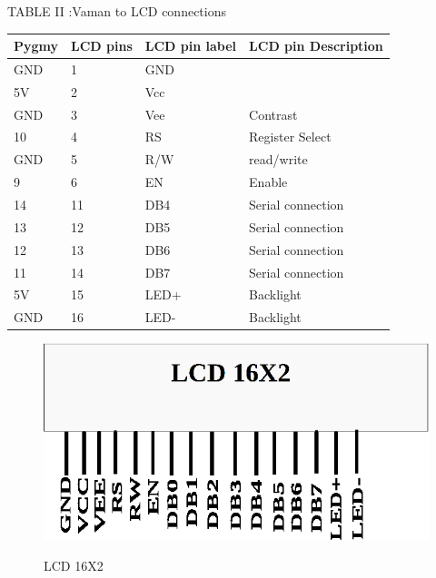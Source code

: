 \documentclass[twocolumn,13pt]{article}
\begin{document}
\begin{center}
    TABLE II :Vaman to LCD connections
\end{center}
 \begin{tabular}{ |p{1.5cm}|p{1.5cm}|p{1.5cm}|p{1.5cm}| }
 \hline
 \setlength{\tabcolsep}{3pt}
Pygmy & LCD pins & LCD pin label & LCD pin Description\\
\hline
 GND & 1& GND & \\
 \hline
 5V & 2 & Vcc &\\
 \hline
 GND & 3 & Vee & Contrast\\
 \hline
 10 & 4 & RS & Register Select\\
 \hline
 GND & 5 & R/W & read/write\\
 \hline
 9 & 6 & EN &Enable\\
 \hline
 14 & 11 & DB4 & Serial connection\\
 \hline
 13 & 12 & DB5 & Serial connection\\
 \hline
 12 & 13 & DB6 & Serial connection\\
 \hline
 11 & 14 & DB7 & Serial connection\\
 \hline
 5V & 15 & LED+ & Backlight\\
 \hline
 GND & 16 & LED- & Backlight\\
 \hline
\end{tabular}

\begin{figure}[h!]
\vspace{7cm}
\centering
\includegraphics[scale=0.4]{figs/lcd.png}   \\
\centering
\caption{LCD 16X2}
\end{figure}

\vspace{10 cm}
\end{document}
